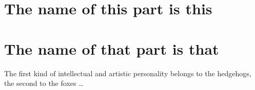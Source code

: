 \documentclass[a4paper,twoside]{ociamthesis}
\newcommand*{\bibtitle}{References}
\begin{document}
\flushbottom
\part{The name of this part is this}

\part{The name of that part is that}



\startappendices




\begin{savequote}[8cm]
The first kind of intellectual and artistic personality belongs to the hedgehogs, the second to the foxes \dots
\end{savequote}

\setlength{\baselineskip}{0pt} %

{\renewcommand*\MakeUppercase[1]{#1}%
\printbibliography[heading=bibintoc,title={\bibtitle}]}
\end{document}
